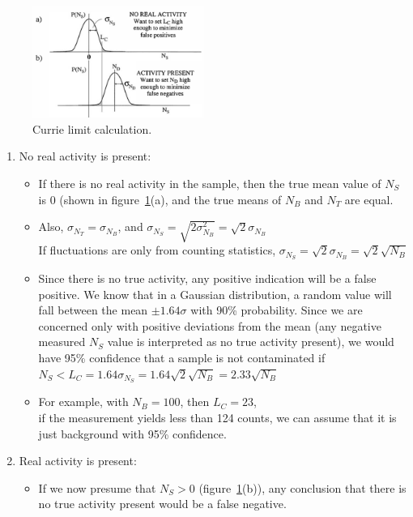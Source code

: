 \begin{enumerate}
    \begin{figure}[ht]
        \centering
        \includegraphics[width=0.5\textwidth]{images/currie_limit.png}
        \caption{Currie limit calculation.}
        \label{fig:currie_limit}
    \end{figure}
    \begin{enumerate}
        \item No real activity is present:
        \begin{itemize}
            \item If there is no real activity in the sample, then the true mean value of $N_S$ is $0$ (shown in figure~\ref{fig:currie_limit}(a), and the true means of $N_B$ and $N_T$ are equal.
            \item Also, $\sigma_{N_T}=\sigma_{N_B}$, and $\sigma_{N_S}=\sqrt{2\sigma^2_{N_B}}=\sqrt{2}\sigma_{N_B}$\\
            If fluctuations are only from counting statistics, $\sigma_{N_S}=\sqrt{2}\sigma_{N_B}=\sqrt{2}\sqrt{N_B}$
            \item Since there is no true activity, any positive indication will be a false positive. We know that in a Gaussian distribution, a random value will fall between the mean $\pm1.64\sigma$ with 90\% probability. Since we are concerned only with positive deviations from the mean (any negative measured $N_S$ value is interpreted as no true activity present), we would have 95\% confidence that a sample is not contaminated if $N_S<L_C=1.64\sigma_{N_S}=1.64\sqrt{2}\sqrt{N_B}=2.33\sqrt{N_B}$ 
            \item For example, with $N_B=100$, then $L_C=23$,\\
            if the measurement yields less than 124 counts, we can assume that it is just background with 95\% confidence.
        \end{itemize}
        \item Real activity is present:
        \begin{itemize}
            \item If we now presume that $N_S>0$ (figure~\ref{fig:currie_limit}(b)), any conclusion that there is no true activity present would be a false negative. 

\end{itemize}
\end{enumerate}
\end{enumerate}
